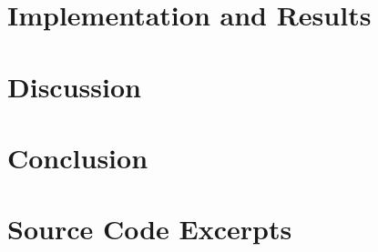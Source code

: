 \documentclass[14pt, a4paper, oneside]{extreport}
\numberwithin{equation}{chapter}
\begin{document}
\chapter{Implementation and Results}


\chapter{Discussion}


\chapter*{Conclusion}


\printbibliography[heading=bibintoc, title={References}]

\appendix
\chapter{Source Code Excerpts}
% 
\end{document}
